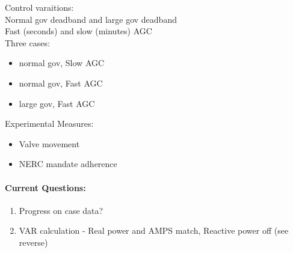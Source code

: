 \documentclass[12pt]{article}
\begin{document}
\begin{multicols}{2}
Control varaitions:\\
Normal gov deadband and large gov deadband \\
Fast (seconds) and slow (minutes) AGC
\\ Three cases: 
\begin{itemize}
	\itemsep0em 
\item normal gov, Slow AGC
\item normal gov, Fast AGC
\item large gov, Fast AGC
\end{itemize}

Experimental Measures:
\begin{itemize}
\itemsep 0em
\item Valve movement
\item NERC mandate adherence
\end{itemize}

		




	\paragraph{Current Questions:}
	\begin{enumerate}
\itemsep0em 
	\item Progress on case data?
	\item VAR calculation - Real power and AMPS match, Reactive power off (see reverse)
	\end{enumerate}
	

\end{multicols}
\end{document}
